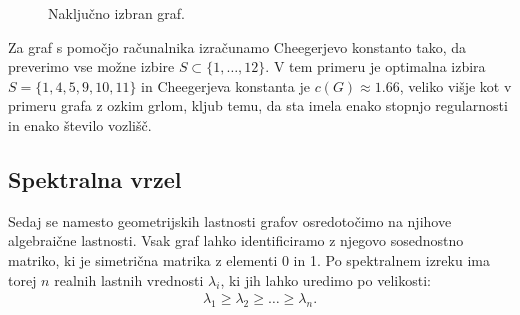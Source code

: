 \begin{primer}
\begin{figure}[H]
        \caption{Naključno izbran graf.}
    \end{figure}
    Za graf s pomočjo računalnika izračunamo Cheegerjevo konstanto tako, da preverimo vse možne izbire \(S \subset \{1, \ldots, 12\}\). V tem primeru je optimalna izbira \(S = \{1, 4, 5, 9, 10, 11\}\) in Cheegerjeva konstanta je \(c(G)\approx 1.66\), veliko višje kot v primeru grafa z ozkim grlom, kljub temu, da sta imela enako stopnjo regularnosti in enako število vozlišč.
\end{primer}
\subsection{Spektralna vrzel}
Sedaj se namesto geometrijskih lastnosti grafov osredotočimo na njihove algebraične lastnosti. Vsak graf lahko identificiramo z njegovo sosednostno matriko, ki je simetrična matrika z elementi 0 in 1. Po spektralnem izreku ima torej \(n\) realnih lastnih vrednosti \(\lambda_i\), ki jih lahko uredimo po velikosti:
\begin{align*}
    \lambda_1 \geq \lambda_2 \geq \ldots \geq \lambda_n.
\end{align*}

